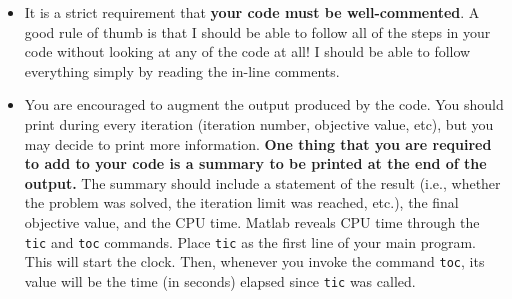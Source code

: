 \documentclass[12pt]{article}
\begin{document}
\begin{itemize}
  \item It is a strict requirement that \textbf{your code must be well-commented}.  A good rule of thumb is that I should be able to follow all of the steps in your code without looking at any of the code at all!  I should be able to follow everything simply by reading the in-line comments.  
  \item You are encouraged to augment the output produced by the code.  You should print during every iteration (iteration number, objective value, etc)\!\!, but you may decide to print more information.  \textbf{One thing that you are required to add to your code is a summary to be printed at the end of the output.}  The summary should include a statement of the result (i.e., whether the problem was solved, the iteration limit was reached, etc.), the final objective value, and the CPU time.  Matlab reveals CPU time through the \texttt{tic} and \texttt{toc} commands.  Place \texttt{tic} as the first line of your main program.  This will start the clock.  Then, whenever you invoke the command \texttt{toc}, its value will be the time (in seconds) elapsed since \texttt{tic} was called.
\end{itemize}
\end{document}
